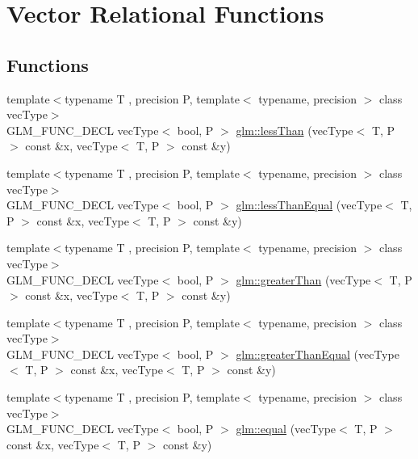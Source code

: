 \hypertarget{group__core__func__vector__relational}{\section{Vector Relational Functions}
\label{group__core__func__vector__relational}
}
\subsection*{Functions}
\begin{DoxyCompactItemize}
\item 
{\footnotesize template$<$typename T , precision P, template$<$ typename, precision $>$ class vec\-Type$>$ }\\G\-L\-M\-\_\-\-F\-U\-N\-C\-\_\-\-D\-E\-C\-L vec\-Type$<$ bool, P $>$ \hyperlink{group__core__func__vector__relational_ga6261970937a70b0b747ae0d3ade1c188}{glm\-::less\-Than} (vec\-Type$<$ T, P $>$ const \&x, vec\-Type$<$ T, P $>$ const \&y)
\item 
{\footnotesize template$<$typename T , precision P, template$<$ typename, precision $>$ class vec\-Type$>$ }\\G\-L\-M\-\_\-\-F\-U\-N\-C\-\_\-\-D\-E\-C\-L vec\-Type$<$ bool, P $>$ \hyperlink{group__core__func__vector__relational_gaaf1d88119f11200c32011de7c5ec0102}{glm\-::less\-Than\-Equal} (vec\-Type$<$ T, P $>$ const \&x, vec\-Type$<$ T, P $>$ const \&y)
\item 
{\footnotesize template$<$typename T , precision P, template$<$ typename, precision $>$ class vec\-Type$>$ }\\G\-L\-M\-\_\-\-F\-U\-N\-C\-\_\-\-D\-E\-C\-L vec\-Type$<$ bool, P $>$ \hyperlink{group__core__func__vector__relational_gadd80263161a308462d3e3e287e79cccd}{glm\-::greater\-Than} (vec\-Type$<$ T, P $>$ const \&x, vec\-Type$<$ T, P $>$ const \&y)
\item 
{\footnotesize template$<$typename T , precision P, template$<$ typename, precision $>$ class vec\-Type$>$ }\\G\-L\-M\-\_\-\-F\-U\-N\-C\-\_\-\-D\-E\-C\-L vec\-Type$<$ bool, P $>$ \hyperlink{group__core__func__vector__relational_gaee7e101f8cc4ea43924f14dcdeb2ef26}{glm\-::greater\-Than\-Equal} (vec\-Type$<$ T, P $>$ const \&x, vec\-Type$<$ T, P $>$ const \&y)
\item 
{\footnotesize template$<$typename T , precision P, template$<$ typename, precision $>$ class vec\-Type$>$ }\\G\-L\-M\-\_\-\-F\-U\-N\-C\-\_\-\-D\-E\-C\-L vec\-Type$<$ bool, P $>$ \hyperlink{group__core__func__vector__relational_ga39c80d8baf49b0ce69f2bb22d45b3801}{glm\-::equal} (vec\-Type$<$ T, P $>$ const \&x, vec\-Type$<$ T, P $>$ const \&y)

\end{DoxyCompactItemize}
